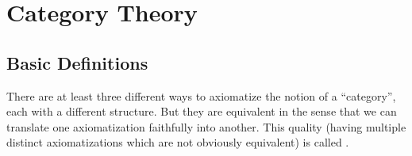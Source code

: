 
\chapter{Category Theory}

\section{Basic Definitions}

\begin{remark}
There are at least three different ways to axiomatize the notion of a
``category'', each with a different structure. But they are equivalent
in the sense that we can translate one axiomatization faithfully into
another. This quality (having multiple distinct axiomatizations which
are not obviously equivalent) is called .
\end{remark}

